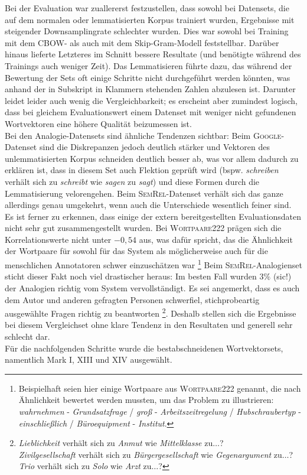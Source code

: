   Bei der Evaluation war zuallererst festzustellen, dass sowohl bei Datensets, die auf dem normalen oder lemmatisierten Korpus
  trainiert wurden, Ergebnisse mit steigender Downsamplingrate schlechter wurden. Dies war sowohl bei Training mit dem CBOW- als
  auch mit dem Skip-Gram-Modell feststellbar. Darüber hinaus lieferte Letzteres im Schnitt bessere Resultate (und benötigte
  während des Trainings auch weniger Zeit). Das Lemmatisieren führte dazu, das während der Bewertung der Sets oft einige
  Schritte nicht durchgeführt werden könnten, was anhand der in Subskript in Klammern stehenden Zahlen abzulesen ist.
  Darunter leidet leider auch wenig die Vergleichbarkeit; es erscheint aber zumindest logisch, dass bei gleichem Evaluationswert
  einem Datenset mit weniger nicht gefundenen Wortvektoren eine höhere Qualität beizumessen ist.\\
  Bei den Analogie-Datensets sind ähnliche Tendenzen sichtbar: Beim \textsc{Google}-Datenset sind die Diskrepanzen jedoch
  deutlich stärker und Vektoren des unlemmatisierten Korpus schneiden deutlich besser ab, was vor allem dadurch
  zu erklären ist, dass in diesem Set auch Flektion geprüft wird (bspw. \emph{schreiben} verhält sich zu \emph{schreibt} wie
   \emph{sagen} zu \emph{sagt}) und diese Formen durch die Lemmatisierung velorengehen. Beim \textsc{SemRel}-Datenset
  verhält sich das ganze allerdings genau umgekehrt, wenn auch die Unterschiede wesentlich feiner sind.\\

  Es ist ferner zu erkennen, dass einige der extern bereitgestellten Evaluationsdaten nicht sehr gut zusammengestellt wurden.
  Bei \textsc{Wortpaare222} prägen sich die Korrelationswerte nicht unter $-0,54$ aus, was dafür spricht, das die Ähnlichkeit
  der Wortpaare für sowohl für das System als möglicherweise auch für die menschlichen Annotatoren schwer einzuschätzen war
  \footnote{Beispielhaft seien hier einige Wortpaare aus \textsc{Wortpaare222} genannt, die nach Ähnlichkeit bewertet werden
  mussten, um das Problem zu illustrieren:\\
  \emph{wahrnehmen} - \emph{Grundsatzfrage} / \emph{groß} - \emph{Arbeitszeitregelung} /
  \emph{Hubschraubertyp} - \emph{einschließlich} / \emph{Büroequipment} - \emph{Institut}.}
  Beim \textsc{SemRel}-Analogienset sticht dieser Fakt noch viel drastischer heraus: Im besten Fall wurden $3\%$ (sic!)
  der Analogien richtig vom System vervollständigt. Es sei angemerkt, dass es auch dem Autor und anderen gefragten Personen
  schwerfiel, stichprobeartig ausgewählte Fragen richtig zu beantworten
  \footnote{\emph{Lieblichkeit} verhält sich zu \emph{Anmut} wie \emph{Mittelklasse} zu$\ldots$? \\
  \emph{Zivilgesellschaft} verhält sich zu \emph{Bürgergesellschaft} wie \emph{Gegenargument} zu$\ldots$? \\
  \emph{Trio} verhält sich zu \emph{Solo}  wie \emph{Arzt} zu$\ldots$? }.
  Deshalb stellen sich die Ergebnisse bei diesem Vergleichset ohne klare Tendenz in den Resultaten und generell sehr schlecht dar.\\

  Für die nachfolgenden Schritte wurde die bestabschneidenen Wortvektorsets, namentlich Mark I, XIII und XIV ausgewählt.
